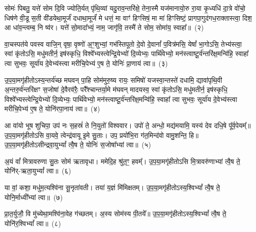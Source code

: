 सोमः॑ पिबतु॒ यत्ते॑ सोम दि॒वि ज्योति॒र्यत् पृ॑थि॒व्यां यदु॒राव॒न्तरि॑क्षे॒ तेना॒स्मै यज॑मानायो॒रु रा॒या कृ॒ध्यधि॑ दा॒त्रे वो॑चो॒ धिष॑णे वी॒डू स॒ती वी॑डयेथा॒मूर्जं॑ दधाथा॒मूर्जं॑ मे धत्तं॒ मा वाꣳ॑ हिꣳसिषं॒ मा मा॑ हिꣳसिष्टं॒ प्रागपा॒गुद॑गध॒राक्तास्त्वा॒ दिश॒ आ धा॑व॒न्त्वम्ब॒ नि ष्व॑र। यत्ते॑ सो॒मादा᳚भ्यं॒ नाम॒ जागृ॑वि॒ तस्मै॑ ते सोम॒ सोमा॑य॒ स्वाहा᳚॥~(२)\ip

{\anuvakamend[{यु॒ष्माकꣴ॑ स्वर॒ यत्ते॒ नव॑ च}]}

वा॒चस्पत॑ये पवस्व वाजि॒न् वृषा॒ वृष्णो॑ अ॒ꣳ॒शुभ्यां॒ गभ॑स्तिपूतो दे॒वो दे॒वानां᳚ प॒वित्र॑मसि॒ येषां᳚ भा॒गो\-ऽसि॒ तेभ्य॑स्त्वा॒ स्वां कृ॑तो\-ऽसि॒ मधु॑मतीर्न॒ इष॑स्कृधि॒ विश्वे᳚भ्यस्त्वेन्द्रि॒येभ्यो॑ दि॒व्येभ्यः॒ पार्थि॑वेभ्यो॒ मन॑स्त्वाष्टू॒र्व॑न्त\-रि॑क्ष॒मन्वि॑हि॒ स्वाहा᳚ त्वा सुभवः॒ सूर्या॑य दे॒वेभ्य॑स्त्वा मरीचि॒पेभ्य॑ ए॒ष ते॒ योनिः॑ प्रा॒णाय॑ त्वा॥~(३)\ip

{\anuvakamend[{वा॒चः स॒प्तच॑त्वारिꣳशत्}]}

उ॒प॒या॒मगृ॑हीतो\-ऽस्य॒न्तर्य॑च्छ मघवन् पा॒हि सोम॑मुरु॒ष्य रायः॒ समिषो॑ यजस्वा॒न्तस्ते॑ दधामि॒ द्यावा॑\-पृथि॒वी अ॒न्तरु॒र्व॑न्तरि॑क्षꣳ स॒जोषा॑ दे॒वैरव॑रैः॒ परै᳚श्चान्तर्या॒मे म॑घवन् मादयस्व॒ स्वां कृ॑तो\-ऽसि॒ मधु॑मतीर्न॒ इष॑स्कृधि॒ विश्वे᳚भ्यस्त्वेन्द्रि॒येभ्यो॑ दि॒व्येभ्यः॒ पार्थि॑वेभ्यो॒ मन॑स्त्वाष्टू॒र्व॑न्त\-रि॑क्ष॒मन्वि॑हि॒ स्वाहा᳚ त्वा सुभवः॒ सूर्या॑य दे॒वेभ्य॑स्त्वा मरीचि॒पेभ्य॑ ए॒ष ते॒ योनि॑रपा॒नाय॑ त्वा॥~(४)\ip

{\anuvakamend[{दे॒वेभ्यः॑ स॒प्त च॑}]}

आ वा॑यो भूष शुचिपा॒ उप॑ नः स॒हस्रं॑ ते नि॒युतो॑ विश्ववार। उपो॑ ते॒ अन्धो॒ मद्य॑मयामि॒ यस्य॑ देव दधि॒षे पू᳚र्व॒पेयम्᳚॥ उ॒प॒या॒मगृ॑हीतो\-ऽसि वा॒यवे॒ त्वेन्द्र॑वायू इ॒मे सु॒ताः। उप॒ प्रयो॑भि॒रा ग॑त॒मिन्द॑वो वामु॒शन्ति॒ हि॥ उ॒प॒या॒मगृ॑हीतो\-ऽसीन्द्रवा॒यु\-भ्यां᳚ त्वै॒ष ते॒ योनिः॑ स॒जोषा᳚भ्यां त्वा॥~(५)\ip

{\anuvakamend[{आ वा॑यो॒ त्रिच॑त्वारिꣳशत्}]}

अ॒यं वां᳚ मित्रावरुणा सु॒तः सोम॑ ऋतावृधा। ममेदि॒ह श्रु॑त॒ꣳ॒ हवम्᳚। उ॒प॒या॒मगृ॑हीतो\-ऽसि मि॒त्रावरु॑णाभ्यां त्वै॒ष ते॒ योनि॑र्-ऋता॒यु\-भ्यां᳚ त्वा॥~(६)\ip

{\anuvakamend[{अ॒यं वां᳚ विꣳश॒तिः}]}

या वां॒ कशा॒ मधु॑म॒त्यश्वि॑ना सू॒नृता॑वती। तया॑ य॒ज्ञं मि॑मिक्षतम्। उ॒प॒या॒मगृ॑हीतो\-ऽस्य॒श्वि\-भ्यां᳚ त्वै॒ष ते॒ योनि॒र्माध्वी᳚भ्यां त्वा॥~(७)\ip

{\anuvakamend[{या वा॑म॒ष्टाद॑श}]}

प्रा॒त॒र्युजौ॒ वि मु॑च्येथा॒मश्वि॑ना॒वेह ग॑च्छतम्। अ॒स्य सोम॑स्य पी॒तये᳚॥ उ॒प॒या॒मगृ॑हीतो\-ऽस्य॒श्वि\-भ्यां᳚ त्वै॒ष ते॒ योनि॑र॒श्वि\-भ्यां᳚ त्वा॥~(८)\ip

